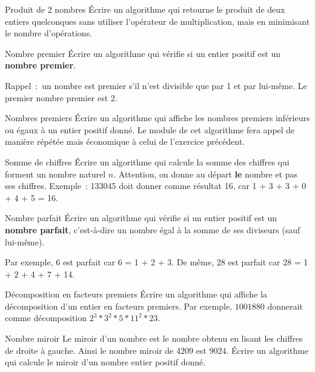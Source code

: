 	\begin{Exercice}{Produit de 2 nombres}
		Écrire un algorithme qui retourne le produit de deux entiers quelconques
		sans utiliser l’opérateur de multiplication, mais en minimisant le
		nombre d’opérations.
	\end{Exercice}
	
	\begin{Exercice}{Nombre premier}
		Écrire un algorithme qui vérifie si un entier positif est un
		\textbf{nombre premier}. 
		
		Rappel~:~un nombre est premier s’il n’est divisible que par 1 et par
		lui-même. Le premier nombre premier est 2.
	\end{Exercice}
	
	\begin{Exercice}{Nombres premiers}
		Écrire un algorithme qui affiche les nombres premiers inférieurs ou
		égaux à un entier positif donné. Le module de cet algorithme fera appel
		de manière répétée mais économique à celui de l’exercice précédent.
	\end{Exercice}

	\begin{Exercice}{Somme de chiffres}
		Écrire un algorithme qui calcule la somme des chiffres qui forment un
		nombre naturel $n$. Attention, on donne au départ \textbf{le} nombre et
		pas ses chiffres. Exemple~: 133045 doit donner comme résultat 16,
		car 1 + 3 + 3 + 0 + 4 + 5 = 16.
	\end{Exercice}
	
	\begin{Exercice}{Nombre parfait}
		Écrire un algorithme qui vérifie si un entier positif est un
		\textbf{nombre parfait}, c’est-à-dire un nombre égal à la somme de ses
		diviseurs (sauf lui-même). 
		
		Par exemple, 6 est parfait car 6 = 1 + 2 + 3. 
		De même, 28 est parfait car 28 = 1 + 2 + 4 + 7 + 14.
	\end{Exercice}
	
	\begin{Exercice}{Décomposition en facteurs premiers}
		Écrire un algorithme qui affiche la décomposition 
		d’un entier en facteurs premiers. 
		Par exemple, $1001880$ donnerait comme décomposition
		$2^3 * 3^2 * 5 * 11^2 * 23$.
	\end{Exercice}

	\begin{Exercice}{Nombre miroir}
		Le miroir d'un nombre est le nombre obtenu
		en lisant les chiffres de droite à gauche.
		Ainsi le nombre miroir de $4209$ est $9024$.
		Écrire un algorithme qui calcule le miroir
		d'un nombre entier positif donné.
	\end{Exercice}
	
